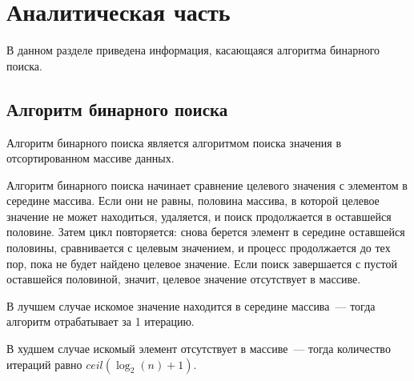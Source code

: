 \chapter{Аналитическая часть}

В данном разделе приведена информация, касающаяся алгоритма бинарного поиска.

\section{Алгоритм бинарного поиска}

Алгоритм бинарного поиска является алгоритмом поиска значения в отсортированном массиве данных.

Алгоритм бинарного поиска начинает сравнение целевого значения с элементом в середине массива.
Если они не равны, половина массива, в которой целевое значение не может находиться, удаляется, и поиск продолжается в оставшейся половине.
Затем цикл повторяется: снова берется элемент в середине оставшейся половины, сравнивается с целевым значением, и процесс продолжается до тех пор, пока не будет найдено целевое значение.
Если поиск завершается с пустой оставшейся половиной, значит, целевое значение отсутствует в массиве.

В лучшем случае искомое значение находится в середине массива~--- тогда алгоритм отрабатывает за 1 итерацию.

В худшем случае искомый элемент отсутствует в массиве~--- тогда количество итераций равно $ceil(\log_2(n) + 1)$.